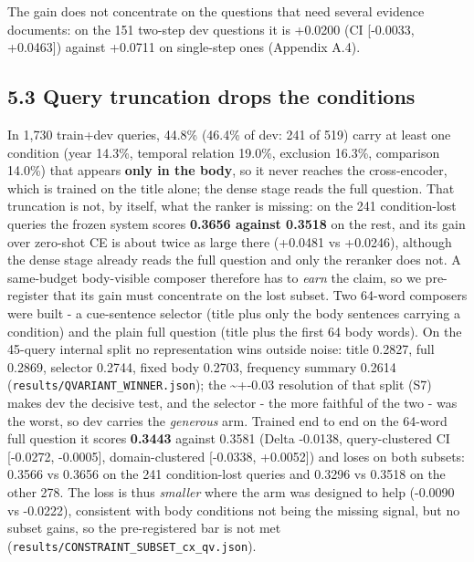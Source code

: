 \documentclass[11pt]{article}
\begin{document}
The gain does not concentrate on the questions that need several evidence documents: on the 151 two-step dev questions it is +0.0200 (CI [-0.0033, +0.0463]) against +0.0711 on single-step ones (Appendix A.4).

\subsection*{5.3 Query truncation drops the conditions}
In 1,730 train+dev queries, 44.8\% (46.4\% of dev: 241 of 519) carry at least one condition (year 14.3\%, temporal relation 19.0\%, exclusion 16.3\%, comparison 14.0\%) that appears \textbf{only in the body}, so it never reaches the cross-encoder, which is trained on the title alone; the dense stage reads the full question. That truncation is not, by itself, what the ranker is missing: on the 241 condition-lost queries the frozen system scores \textbf{0.3656 against 0.3518} on the rest, and its gain over zero-shot CE is about twice as large there (+0.0481 vs +0.0246), although the dense stage already reads the full question and only the reranker does not. A same-budget body-visible composer therefore has to \emph{earn} the claim, so we pre-register that its gain must concentrate on the lost subset. Two 64-word composers were built - a cue-sentence selector (title plus only the body sentences carrying a condition) and the plain full question (title plus the first 64 body words). On the 45-query internal split no representation wins outside noise: title 0.2827, full 0.2869, selector 0.2744, fixed body 0.2703, frequency summary 0.2614 (\texttt{results/QVARIANT\_WINNER.json}); the \textasciitilde{}+-0.03 resolution of that split (S7) makes dev the decisive test, and the selector - the more faithful of the two - was the worst, so dev carries the \emph{generous} arm. Trained end to end on the 64-word full question it scores \textbf{0.3443} against 0.3581 (Delta -0.0138, query-clustered CI [-0.0272, -0.0005], domain-clustered [-0.0338, +0.0052]) and loses on both subsets: 0.3566 vs 0.3656 on the 241 condition-lost queries and 0.3296 vs 0.3518 on the other 278. The loss is thus \emph{smaller} where the arm was designed to help (-0.0090 vs -0.0222), consistent with body conditions not being the missing signal, but no subset gains, so the pre-registered bar is not met (\texttt{results/CONSTRAINT\_SUBSET\_cx\_qv.json}).
\end{document}
